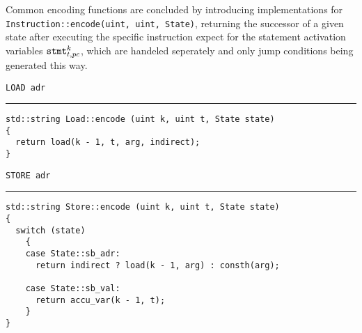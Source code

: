 \noindent
Common encoding functions are concluded by introducing implementations for \lstinline[style=c++, basicstyle=\normalsize\ttfamily]{Instruction::encode(uint, uint, State)}, returning the successor of a given state after executing the specific instruction expect for the statement activation variables $\texttt{stmt}^k_{t, pc}$, which are handeled seperately and only jump conditions being generated this way.

\newpage

\newcommand{\defencode}[1]{
  \par\noindent
  #1
  \par\noindent
  \rule[0.5\baselineskip]{\textwidth}{0.1pt}\vspace{-1.2\baselineskip}%
}

\defencode{\texttt{LOAD adr}}
\begin{lstlisting}[style=c++]
std::string Load::encode (uint k, uint t, State state)
{
  return load(k - 1, t, arg, indirect);
}
\end{lstlisting}


\defencode{\texttt{STORE adr}}
\begin{lstlisting}[style=c++]
std::string Store::encode (uint k, uint t, State state)
{
  switch (state)
    {
    case State::sb_adr:
      return indirect ? load(k - 1, arg) : consth(arg);

    case State::sb_val:
      return accu_var(k - 1, t);
    }
}
\end{lstlisting}

